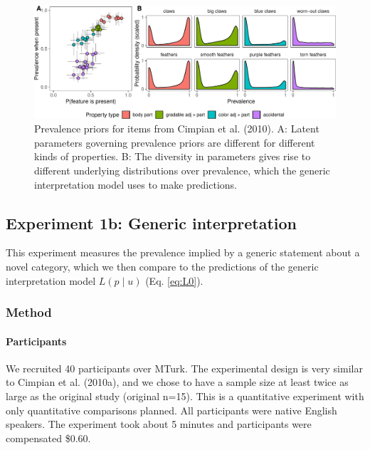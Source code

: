 \documentclass[,man,floatsintext]{apa6}
\let\oldparagraph\paragraph
\renewcommand{\paragraph}[1]{\oldparagraph{#1}\mbox{}}
\theoremstyle{definition}
\theoremstyle{definition}
\theoremstyle{definition}
\theoremstyle{remark}
\begin{document}
\begin{figure}
\centering
\includegraphics{genint_files/figure-latex/cimpian-prevPrior-1.pdf}
\caption{\label{fig:cimpian-prevPrior}Prevalence priors for items from
Cimpian et al. (2010). A: Latent parameters governing prevalence priors
are different for different kinds of properties. B: The diversity in
parameters gives rise to different underlying distributions over
prevalence, which the generic interpretation model uses to make
predictions.}
\end{figure}

\hypertarget{experiment-1b-generic-interpretation}{%
\subsection{Experiment 1b: Generic
interpretation}\label{experiment-1b-generic-interpretation}}

This experiment measures the prevalence implied by a generic statement
about a novel category, which we then compare to the predictions of the
generic interpretation model \(L(p \mid u)\) (Eq. \ref{eq:L0}).

\hypertarget{method-1}{%
\subsubsection{Method}\label{method-1}}

\hypertarget{participants-1}{%
\paragraph{Participants}\label{participants-1}}

We recruited 40 participants over MTurk. The experimental design is very
similar to Cimpian et al. (2010a), and we chose to have a sample size at
least twice as large as the original study (original n=15). This is a
quantitative experiment with only quantitative comparisons planned. All
participants were native English speakers. The experiment took about 5
minutes and participants were compensated \$0.60.
\end{document}
